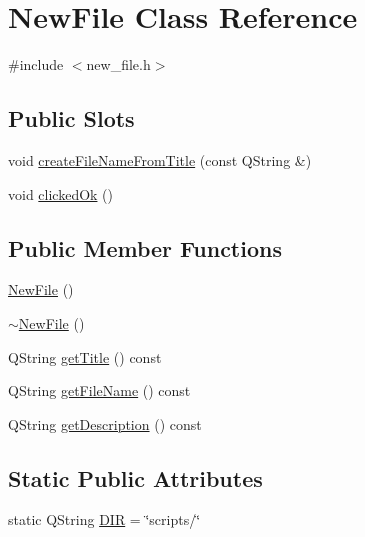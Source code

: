 \hypertarget{class_new_file}{\section{New\-File Class Reference}
\label{class_new_file}
}


{\ttfamily \#include $<$new\-\_\-file.\-h$>$}

\subsection*{Public Slots}
\begin{DoxyCompactItemize}
\item 
void \hyperlink{class_new_file_ae99cefeff42b668dc8a26b3d3da5f9d7}{create\-File\-Name\-From\-Title} (const Q\-String \&)
\item 
void \hyperlink{class_new_file_ab70f304a56d8d9eae568a9e1abad2833}{clicked\-Ok} ()
\end{DoxyCompactItemize}
\subsection*{Public Member Functions}
\begin{DoxyCompactItemize}
\item 
\hyperlink{class_new_file_a7696c33fbf1304838ec0adbacf51dbfe}{New\-File} ()
\item 
\hyperlink{class_new_file_ac379b979f08ade9495607557c00c187a}{$\sim$\-New\-File} ()
\item 
Q\-String \hyperlink{class_new_file_a14b638676ad9878013bc8f3dee45f72d}{get\-Title} () const 
\item 
Q\-String \hyperlink{class_new_file_ae7b88b8d1a7b03d79c06cdc0c012439b}{get\-File\-Name} () const 
\item 
Q\-String \hyperlink{class_new_file_a3982bd8bfcf5154bb0eba7c2aabebd6e}{get\-Description} () const 
\end{DoxyCompactItemize}
\subsection*{Static Public Attributes}
\begin{DoxyCompactItemize}
\item 
static Q\-String \hyperlink{class_new_file_af5c82e32b68623e27ae25421e13757e3}{D\-I\-R} = \char`\"{}scripts/\char`\"{}
\end{DoxyCompactItemize}

